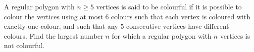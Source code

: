 A regular polygon with $n \geq 5$ vertices is said to be colourful if it is possible to colour the vertices using at most $6$ colours such that each vertex is coloured with exactly one colour, and such that any $5$ consecutive vertices have different colours. Find the largest number $n$ for which a regular polygon with $n$ vertices is not colourful.
